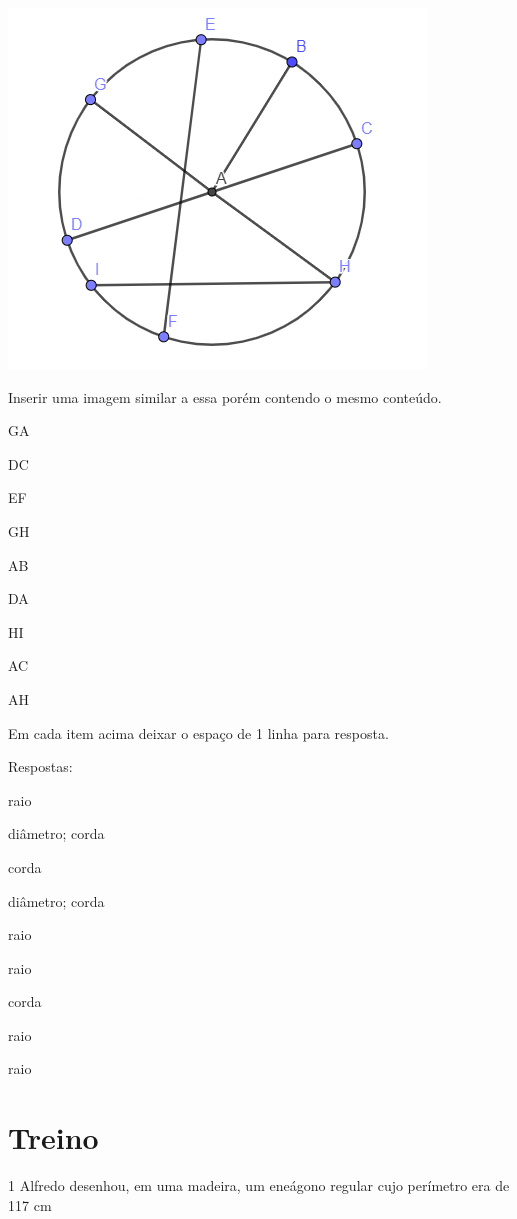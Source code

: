 \includegraphics[width=2\times 98681in,height=2\times 57292in]{./imgSAEB_8_MAT/media/image12.png}

Inserir uma imagem similar a essa porém contendo o mesmo conteúdo.

\item GA
\item DC
\item EF
\item GH
\item AB
\item DA
\item HI
\item AC
\item AH

Em cada item acima deixar o espaço de 1 linha para resposta.

Respostas:

\item raio
\item diâmetro; corda
\item corda
\item diâmetro; corda
\item raio
\item raio
\item corda
\item raio
\item raio

\section{Treino}

\num{1} Alfredo desenhou, em uma madeira, um eneágono regular cujo perímetro
era de 117 cm

